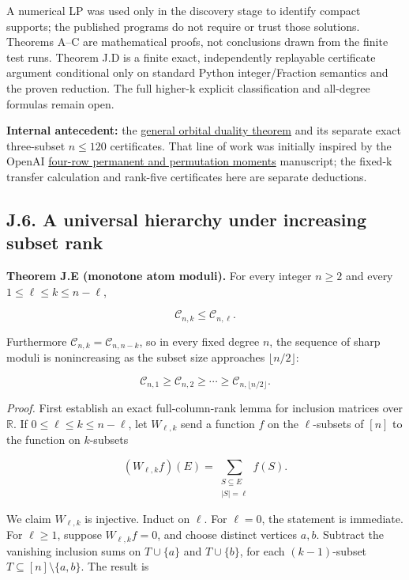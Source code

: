 \documentclass[
  11pt,
]{article}
\begin{document}
A numerical LP was used only in the discovery stage to identify compact
supports; the published programs do not require or trust those
solutions. Theorems A--C are mathematical proofs, not conclusions drawn
from the finite test runs. Theorem J.D is a finite exact, independently
replayable certificate argument conditional only on standard Python
integer/Fraction semantics and the proven reduction. The full higher-k
explicit classification and all-degree formulas remain open.

\textbf{Internal antecedent:} the
\href{../../notes/sharp-robust-permanent/paper.md}{general orbital
duality theorem} and its separate exact three-subset \(n\le120\)
certificates. That line of work was initially inspired by the OpenAI
\href{https://github.com/openai/math/tree/main/preprints/A-strict-four-row-permanent-inequality-and-permutation-moments-September-26-2026}{four-row
permanent and permutation moments} manuscript; the fixed-k transfer
calculation and rank-five certificates here are separate deductions.

\subsection{J.6. A universal hierarchy under increasing subset
rank}\label{j.6.-a-universal-hierarchy-under-increasing-subset-rank}

\textbf{Theorem J.E (monotone atom moduli).} For every integer \(n\ge2\)
and every \(1\le \ell\le k\le n-\ell\),

\[
\boxed{\mathcal C_{n,k}\le \mathcal C_{n,\ell}.}\tag{J.9}
\]

Furthermore \(\mathcal C_{n,k}=\mathcal C_{n,n-k}\), so in every fixed
degree \(n\), the sequence of sharp moduli is nonincreasing as the
subset size approaches \(\lfloor n/2\rfloor\):

\[
\mathcal C_{n,1}\ge\mathcal C_{n,2}\ge\cdots
\ge\mathcal C_{n,\lfloor n/2\rfloor}.
\tag{J.10}
\]

\emph{Proof.} First establish an exact full-column-rank lemma for
inclusion matrices over \(\mathbb R\). If \(0\le\ell\le k\le n-\ell\),
let \(W_{\ell,k}\) send a function \(f\) on the \(\ell\)-subsets of
\([n]\) to the function on \(k\)-subsets

\[
(W_{\ell,k}f)(E)=\sum_{\substack{S\subseteq E\\|S|=\ell}} f(S).
\]

We claim \(W_{\ell,k}\) is injective. Induct on \(\ell\). For
\(\ell=0\), the statement is immediate. For \(\ell\ge1\), suppose
\(W_{\ell,k}f=0\), and choose distinct vertices \(a,b\). Subtract the
vanishing inclusion sums on \(T\cup\{a\}\) and \(T\cup\{b\}\), for each
\((k-1)\)-subset \(T\subseteq[n]\setminus\{a,b\}\). The result is
\end{document}
